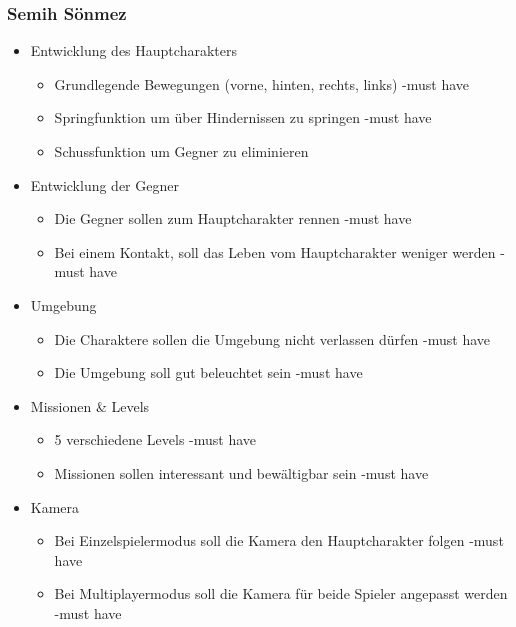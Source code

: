 \hypertarget{semih-suxf6nmez}{%
\subsubsection{Semih Sönmez}\label{semih-suxf6nmez}}

\begin{itemize}
\item
  Entwicklung des Hauptcharakters

  \begin{itemize}
  \item
    Grundlegende Bewegungen (vorne, hinten, rechts, links) -must have
  \item
    Springfunktion um über Hindernissen zu springen -must have
  \item
    Schussfunktion um Gegner zu eliminieren
  \end{itemize}
\item
  Entwicklung der Gegner

  \begin{itemize}
  \item
    Die Gegner sollen zum Hauptcharakter rennen -must have
  \item
    Bei einem Kontakt, soll das Leben vom Hauptcharakter weniger werden
    -must have
  \end{itemize}
\item
  Umgebung

  \begin{itemize}
  \item
    Die Charaktere sollen die Umgebung nicht verlassen dürfen -must have
  \item
    Die Umgebung soll gut beleuchtet sein -must have
  \end{itemize}
\item
  Missionen \& Levels

  \begin{itemize}
  \item
    5 verschiedene Levels -must have
  \item
    Missionen sollen interessant und bewältigbar sein -must have
  \end{itemize}
\item
  Kamera

  \begin{itemize}
  \item
    Bei Einzelspielermodus soll die Kamera den Hauptcharakter folgen
    -must have
  \item
    Bei Multiplayermodus soll die Kamera für beide Spieler angepasst
    werden -must have
  \end{itemize}
\end{itemize}

